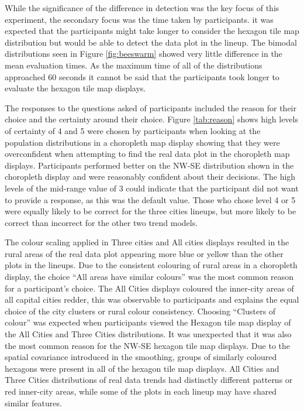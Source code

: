 \documentclass[times, doublespace]{anzsauth}
\begin{document}
While the significance of the difference in detection was the key focus
of this experiment, the secondary focus was the time taken by
participants. it was expected that the participants might take longer to
consider the hexagon tile map distribution but would be able to detect
the data plot in the lineup. The bimodal distributions seen in Figure
\ref{fig:beeswarm} showed very little difference in the mean evaluation
times. As the maximum time of all of the distributions approached 60
seconds it cannot be said that the participants took longer to evaluate
the hexagon tile map displays.

The responses to the questions asked of participants included the reason
for their choice and the certainty around their choice. Figure
\ref{tab:reason} shows high levels of certainty of 4 and 5 were chosen
by participants when looking at the population distributions in a
choropleth map display showing that they were overconfident when
attempting to find the real data plot in the choropleth map displays.
Participants performed better on the NW-SE distribution shown in the
choropleth display and were reasonably confident about their decisions.
The high levels of the mid-range value of 3 could indicate that the
participant did not want to provide a response, as this was the default
value. Those who chose level 4 or 5 were equally likely to be correct
for the three cities lineups, but more likely to be correct than
incorrect for the other two trend models.

The colour scaling applied in Three cities and All cities displays
resulted in the rural areas of the real data plot appearing more blue or
yellow than the other plots in the lineups. Due to the consistent
colouring of rural areas in a choropleth display, the choice ``All areas
have similar colours'' was the most common reason for a participant's choice.
The All Cities displays coloured the inner-city areas of all capital
cities redder, this was observable to participants and explains the
equal choice of the city clusters or rural colour consistency. Choosing
``Clusters of colour'' was expected when participants viewed the Hexagon
tile map display of the All Cities and Three Cities distributions. It
was unexpected that it was also the most common reason for the NW-SE
hexagon tile map displays. Due to the spatial covariance introduced in
the smoothing, groups of similarly coloured hexagons were present in all
of the hexagon tile map displays. All Cities and Three Cities
distributions of real data trends had distinctly different patterns or
red inner-city areas, while some of the plots in each lineup may have
shared similar features.
\end{document}
